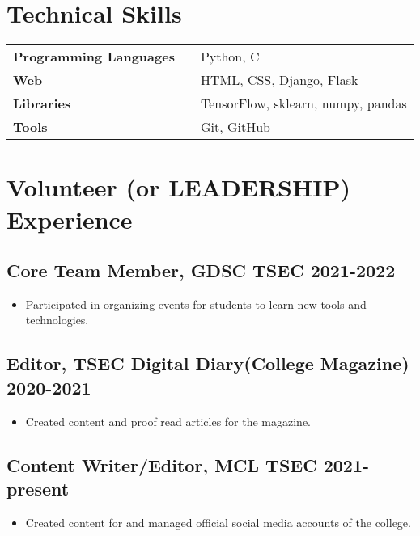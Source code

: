 \documentclass[10pt]{article}
\newenvironment{zitemize}{
\begin{itemize}\itemsep2pt \parskip0pt \parsep1pt}
{\end{itemize}\vspace{-0.5cm}}
\newcommand{\hskills}[1]{
\textbf{\bfseries #1} }
\begin{document}
\section{Technical Skills}
\begin{tabular}{p{11em} p{1em} p{43em}}
\hskills{Programming Languages }&  &  Python, C \\
\hskills{Web} &  & HTML, CSS, Django, Flask \\
\hskills{Libraries} &  & TensorFlow, sklearn, numpy, pandas \\
\hskills{Tools} &  & Git, GitHub \\

\end{tabular}
\vspace{-0.2cm}



\section{Volunteer (or LEADERSHIP) Experience}

\subsection*{Core Team Member, GDSC TSEC \hfill 2021-2022} 
    \begin{zitemize}
            \item Participated in organizing events for students to learn new tools and technologies.
    \end{zitemize}
\subsection*{Editor, TSEC Digital Diary(College Magazine) \hfill 2020-2021} 
    \begin{zitemize}
            \item Created content and proof read articles for the magazine.
    \end{zitemize}
\subsection*{Content Writer/Editor, MCL TSEC \hfill 2021-present} 
    \begin{zitemize}
            \item Created content for and managed official social media accounts of the college.
    \end{zitemize}
\end{document}
